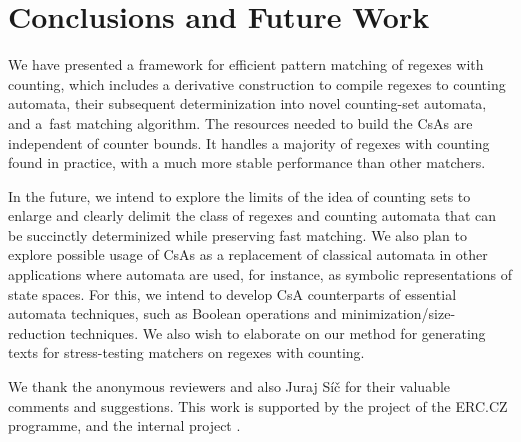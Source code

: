 \documentclass[acmsmall,screen]{acmart}
\newif\ifTR
\begin{document}
\vspace{-0.5mm}
\section{Conclusions and Future Work}

We have presented a framework for efficient pattern matching of regexes with counting,
which includes a derivative construction to compile regexes to counting automata,
their subsequent determinization into novel counting-set automata,
and a~fast matching algorithm.
%
The resources needed to build the CsAs are independent of counter bounds.
%
It handles a majority of regexes with counting found in practice, with a much more stable performance than other matchers.  

In the future, we intend to explore the limits of the idea of counting sets to
enlarge and clearly delimit the class of regexes and counting automata that can
be succinctly determinized while preserving fast matching.
%
We also plan to explore possible usage of CsAs as a replacement of classical automata in other
applications where automata are used, for instance, as symbolic representations
of state spaces. 
For this, we intend to develop CsA counterparts of essential automata
techniques, such as Boolean operations and minimization/size-reduction techniques.
We also wish to elaborate on our method for generating texts for stress-testing matchers on regexes with counting.


\ifTR
\else
\begin{acks}   %
We thank the anonymous reviewers and also Juraj S\'{i}\v{c} for their valuable comments and suggestions.
This work is supported by
the  project  of the ERC.CZ
programme, and
the 
internal project .
\end{acks}
\fi


\newpage


\ifTR
\appendix\eject



\fi


\end{document}
